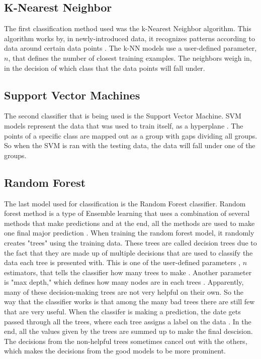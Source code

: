 \documentclass[conference,compsoc]{IEEEtran}
\begin{document}
\subsection{K-Nearest Neighbor}
The first classification method used was the k-Nearest Neighbor algorithm.  This algorithm works by, in newly-introduced data, 
it recognizes patterns according to data around certain data points \cite{random}. The k-NN models use a user-defined parameter, $n$, that defines the 
number of closest training examples. The neighbors weigh in, in the decision of which class that the data points will fall under.

\subsection{Support Vector Machines}
The second classifier that is being used is the Support Vector Machine. SVM models represent the data that was used to train itself, as a hyperplane \cite{classsvm}. The points of a specific class are mapped out as a group with gaps dividing all groups. So when the SVM is ran with the testing data, the data will fall under one of the groups. 

\subsection{Random Forest}
The last model used for classification is the Random Forest classifier. Random forest method is a type of Ensemble learning that uses a combination of several methods that make predictions and at the end, all the methods are used to make one final major prediction \cite{random}. When training the random forest model, it randomly creates "trees" using the training data. 
These trees are called decision trees due to the fact that they are made up of multiple decisions that are used to classify the data each tree is presented with. This is one of the user-defined parameters , $n$ estimators, that tells the classifier how many trees to make \cite{scikit}. Another parameter is "max depth," which defines how many nodes are in each trees \cite{scikit}. Apparently, many of these decision-making trees are not very helpful on their own. So the way that the classifier works is that among the many bad trees there are still few that are very useful. When the classifer is making a prediction, the date gets passed through all the trees, where each tree assigns a label on the data \cite{random}. In the end, all the values given by the trees are summed up to make the final descision. The decisions from the non-helpful trees sometimes cancel out with the others, which makes the decisions from the good models to be more prominent.
\end{document}
